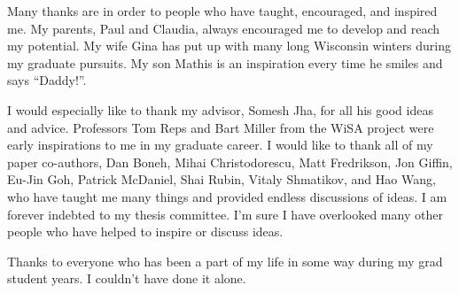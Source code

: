 
Many thanks are in order to people who have taught, encouraged, and
inspired me. My parents, Paul and Claudia, always encouraged
me to develop and reach my potential. My wife Gina has put up with
many long Wisconsin winters during my graduate pursuits. My son Mathis
is an inspiration every time he smiles and says {}``Daddy!''.

I would especially like to thank my advisor, Somesh Jha, for all his
good ideas and advice. Professors Tom Reps and Bart Miller from the
WiSA project were early inspirations to me in my graduate career.
I would like to thank all of my paper co-authors, Dan Boneh, Mihai
Christodorescu, Matt Fredrikson, Jon Giffin, Eu-Jin Goh, Patrick McDaniel,
Shai Rubin, Vitaly Shmatikov, and Hao Wang, who have taught
me many things and provided endless discussions of ideas. 
I am forever indebted to my thesis committee.
I'm sure I have overlooked many other people who have helped to inspire
or discuss ideas.

Thanks to everyone who has been a part of my life in some way during
my grad student years. I couldn't have done it alone.

